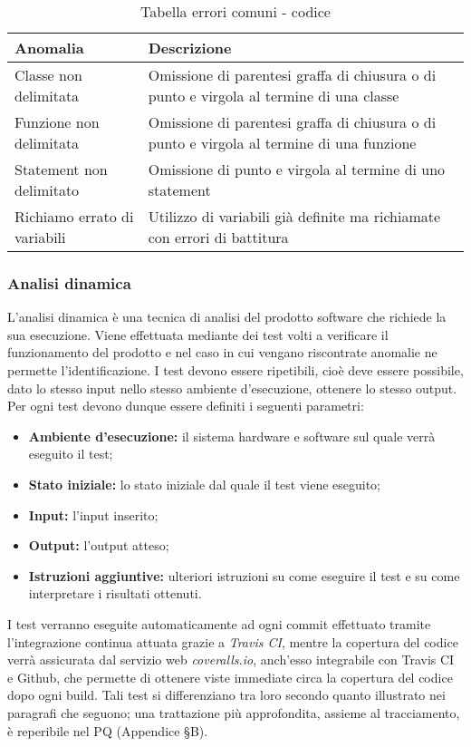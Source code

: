 \documentclass[../NormediProgetto.tex]{subfiles}
\begin{document}
\begin{longtable}{| p{5cm} |p{8cm} |}
	\caption {Tabella errori comuni - codice} \\
	\hline  
	\textbf{Anomalia} & \textbf{Descrizione}  \\ 
	\hline 
	Classe non delimitata & Omissione di parentesi graffa di chiusura o di punto e virgola al termine di una classe \\ 
	\hline 
	Funzione non delimitata & Omissione di parentesi graffa di chiusura o di punto e virgola al termine di una funzione  \\ 
	\hline 
	Statement non delimitato & Omissione di punto e virgola al termine di uno statement \\ 
	\hline 
	Richiamo errato di variabili & Utilizzo di variabili già definite ma richiamate con errori di
	battitura  \\ 
	\hline 
\end{longtable} 

\subsubsection{Analisi dinamica}

L’analisi dinamica è una tecnica di analisi del prodotto software che richiede la sua esecuzione. Viene effettuata mediante dei test volti a verificare il funzionamento del prodotto e nel caso in cui vengano riscontrate anomalie ne permette l’identificazione. I test devono essere ripetibili, cioè deve essere possibile, dato lo stesso input nello stesso ambiente d'esecuzione, ottenere lo stesso output. Per ogni test devono dunque essere definiti i seguenti parametri:

\begin{itemize}
	\item \textbf{Ambiente d'esecuzione:} il sistema hardware e software sul quale verrà eseguito il test;
	\item \textbf{Stato iniziale:} lo stato iniziale dal quale il test viene eseguito;
	\item \textbf{Input:} l’input inserito;
	\item \textbf{Output:} l’output atteso;
	\item \textbf{Istruzioni aggiuntive:} ulteriori istruzioni su come eseguire il test e su come interpretare i risultati ottenuti.
\end{itemize}

I test verranno eseguite automaticamente ad ogni commit effettuato tramite l'integrazione continua attuata grazie a \textit{Travis CI}, mentre la copertura del codice verrà assicurata dal servizio web \textit{coveralls.io}, anch'esso integrabile con Travis CI e Github, che permette di ottenere viste immediate circa la copertura del codice dopo ogni build. Tali test si differenziano tra loro secondo quanto illustrato nei paragrafi che seguono; una
trattazione più approfondita, assieme al tracciamento, è reperibile nel PQ (Appendice §B).
\end{document}
